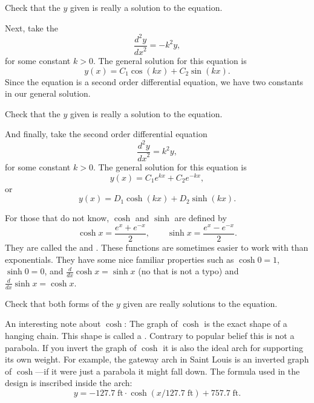 \begin{exercise}
Check that the $y$ given is really a solution to the equation.
\end{exercise}

Next, take the
\emph{}
\begin{equation*}
\frac{d^2y}{{dx}^2} = -k^2 y ,
\end{equation*}
for some constant $k > 0$.
The general solution for this equation is
\begin{equation*}
y(x) = C_1 \cos(kx) + C_2 \sin(kx) .
\end{equation*}
Since the equation is a second order differential equation,
we have two constants in our general solution.

\begin{exercise}
Check that the $y$ given is really a solution to the equation.
\end{exercise}

And finally, take the second order differential equation
\begin{equation*}
\frac{d^2y}{{dx}^2} = k^2 y ,
\end{equation*}
for some constant $k > 0$.
The general solution for this equation is
\begin{equation*}
y(x) = C_1 e^{kx} + C_2 e^{-kx} ,
\end{equation*}
or
\begin{equation*}
y(x) = D_1 \cosh(kx) + D_2 \sinh(kx) .
\end{equation*}

For those that do not know, $\cosh$ and $\sinh$ are defined by
\begin{equation*}
\cosh x = \frac{e^{x} + e^{-x}}{2} , \qquad
\sinh x = \frac{e^{x} - e^{-x}}{2} .
\end{equation*}
They are called the
\emph{}
and
\emph{}.
These functions are sometimes easier to
work with than exponentials.  They have some nice familiar
properties such as
$\cosh 0 = 1$, $\sinh 0 = 0$, and $\frac{d}{dx} \cosh x = \sinh x$ (no that is
not a typo)
and $\frac{d}{dx} \sinh x = \cosh x$.

\begin{exercise}
Check that both forms of the $y$ given are
really solutions to the equation.
\end{exercise}

An interesting note about $\cosh$:  The graph of $\cosh$ is the exact shape
of a hanging chain.  This shape is called
a \emph{}.
Contrary to popular belief this is not a
parabola.  If you invert the graph of $\cosh$ it is also the ideal arch for
supporting its own weight.
For example, the gateway arch in Saint Louis is an inverted graph of
$\cosh$---if it were just a parabola it might fall down.  The formula
used in the design is
inscribed inside the arch:
\begin{equation*}
y = -127.7 \; \textrm{ft} \cdot \cosh({x / 127.7  \; \textrm{ft}}) + 757.7 \;
\textrm{ft} .
\end{equation*}


